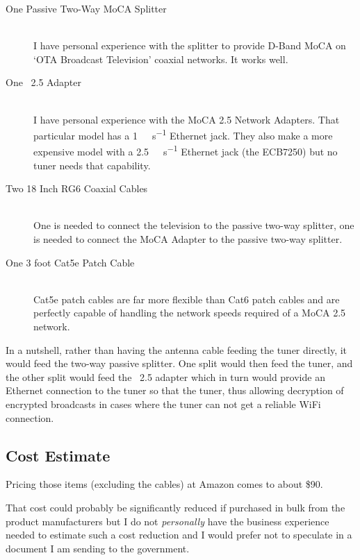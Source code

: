 \begin{description}
  \item[One Passive Two-Way MoCA Splitter] \hfill \\ I have personal experience with the
    splitter to provide D-Band MoCA on `OTA Broadcast Television' coaxial networks. It works
    well.
  \item[One \xdband{}~2.5 Adapter] \hfill \\ I have personal experience with the
    MoCA 2.5 Network Adapters. That particular model has a \qty{1}{\giga\bit\per\second} Ethernet jack.
    They also make a more expensive model with a \qty{2.5}{\giga\bit\per\second} Ethernet jack
    (the ECB7250) but no  tuner needs that capability.
  \item[Two 18 Inch RG6 Coaxial Cables] \hfill \\
    One is needed to connect the television to the passive two-way splitter, one is needed to
    connect the MoCA Adapter to the passive two-way splitter.
  \item[One 3 foot Cat5e Patch Cable] \hfill \\
    Cat5e patch cables are far more flexible than Cat6 patch cables and are perfectly capable of
    handling the network speeds required of a MoCA 2.5 network.
\end{description}

In a nutshell, rather than having the antenna cable feeding the  tuner directly, it would
feed the two-way passive splitter. One split would then feed the  tuner, and the other
split would feed the \xdband{}~2.5 adapter which in turn would provide an Ethernet connection
to the  tuner so that the tuner, thus allowing decryption of encrypted 
broadcasts in cases where the tuner can not get a reliable WiFi connection.

\subsection{Cost Estimate}

Pricing those items (excluding the cables) at Amazon comes to about \$90.

That cost could probably be significantly reduced if purchased in bulk from the product manufacturers
but I do not \emph{personally} have the business experience needed to estimate such a cost reduction
and I would prefer not to speculate in a document I am sending to the government.

